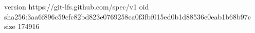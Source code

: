 version https://git-lfs.github.com/spec/v1
oid sha256:3aa6f896c59cfc82bd823e0769258ca0f3fbf015ed0b1d88536e0eab1b68b97c
size 174916
